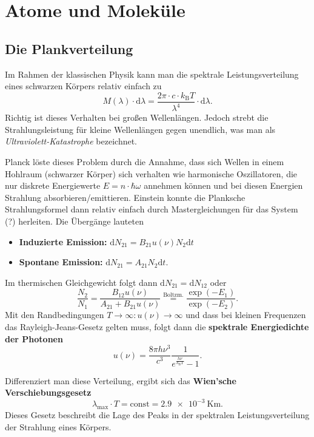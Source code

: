 \chapter{Atome und Moleküle}

\section{Die Plankverteilung}
Im Rahmen der klassischen Physik kann man die spektrale Leistungsverteilung eines schwarzen Körpers relativ einfach zu
\begin{equation*}
	M(\lambda)\cdot\text{d}\lambda = \frac{2\pi\cdot c\cdot k_\text{B}T}{\lambda^4}\cdot\text{d}\lambda.
\end{equation*}
Richtig ist dieses Verhalten bei großen Wellenlängen.
Jedoch strebt die Strahlungsleistung für kleine Wellenlängen gegen unendlich, was man als \textit{Ultraviolett-Katastrophe} bezeichnet.

Planck löste dieses Problem durch die Annahme, dass sich Wellen in einem Hohlraum (schwarzer Körper) sich verhalten wie harmonische Oszillatoren, die nur diskrete Energiewerte $E=n\cdot\hbar\omega$ annehmen können und bei diesen Energien Strahlung absorbieren/emittieren.
Einstein konnte die Planksche Strahlungsformel dann relativ einfach durch Mastergleichungen für das System (?) herleiten.
Die Übergänge lauteten
\begin{itemize}
	\item \textbf{Induzierte Emission:} $\text{d}N_{21} = B_{21}u(\nu)N_2\text{d}t$
	\item \textbf{Spontane Emission:} $\text{d}N_{21} = A_{21}N_2\text{d}t$.
\end{itemize}
Im thermischen Gleichgewicht folgt dann $\text{d}N_{21} = \text{d}N_{12}$ oder
\begin{equation*}
	\frac{N_2}{N_1} = \frac{B_{12}u(\nu)}{A_{21}+B_{21}u(\nu)} \stackrel{\text{Boltzm.}}{=} \frac{\exp(-E_1)}{\exp(-E_2)}.
\end{equation*}
Mit den Randbedingungen $T\rightarrow\infty : u(\nu)\rightarrow\infty$ und dass bei kleinen Frequenzen das Rayleigh-Jeans-Gesetz gelten muss, folgt dann die \textbf{spektrale Energiedichte der Photonen}
\begin{equation*}
	u(\nu) = \frac{8\pi h\nu^3}{c^3}\frac{1}{e^{\frac{h\nu}{k_\text{B}T}} - 1}.
\end{equation*}

Differenziert man diese Verteilung, ergibt sich das \textbf{Wien'sche Verschiebungsgesetz}
\begin{equation*}
	\lambda_\text{max}\cdot T = \text{const} = \SI{2.9e-3}{\kelvin\meter}.
\end{equation*}
Dieses Gesetz beschreibt die Lage des Peaks in der spektralen Leistungsverteilung der Strahlung eines Körpers.

